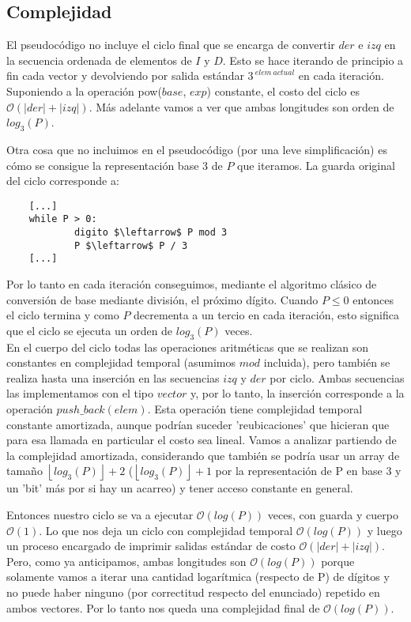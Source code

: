 \newpage
\subsection{Complejidad}
	El pseudocódigo no incluye el ciclo final que se encarga de convertir $der$ e $izq$ en la secuencia ordenada de elementos de $I$ y $D$. Esto se hace iterando de principio a fin cada vector y devolviendo por salida estándar $3^{\ elem \ actual}$ en cada iteración. Suponiendo a la operación pow($base$, $exp$) constante, el costo del ciclo es $\mathcal{O} (|der| + |izq|)$. Más adelante vamos a ver que ambas longitudes son orden de $log_3(P)$.

	Otra cosa que no incluimos en el pseudocódigo (por una leve simplificación) es cómo se consigue la representación base 3 de $P$ que iteramos. La guarda original del ciclo corresponde a:

	\begin{lstlisting}
	[...]
	while P > 0:
        	digito $\leftarrow$ P mod 3
        	P $\leftarrow$ P / 3
	[...]
	\end{lstlisting}

	Por lo tanto en cada iteración conseguimos, mediante el algoritmo clásico de conversión de base mediante división, el próximo dígito. Cuando $P \leq 0$ entonces el ciclo termina y como $P$ decrementa a un tercio en cada iteración, esto significa que el ciclo se ejecuta un orden de $log_3(P)$ veces.
	\\

	En el cuerpo del ciclo todas las operaciones aritméticas que se realizan son constantes en complejidad temporal (asumimos $mod$ incluida), pero también se realiza hasta una inserción en las secuencias $izq$ y $der$ por ciclo. Ambas secuencias las implementamos con el tipo $vector$ y, por lo tanto, la inserción corresponde a la operación $push\_back(elem)$. Esta operación tiene complejidad temporal constante amortizada, aunque podrían suceder 'reubicaciones' que hicieran que para esa llamada en particular el costo sea lineal. Vamos a analizar partiendo de la complejidad amortizada, considerando que también se podría usar un array de tamaño $\left \lfloor{log_3(P)}\right \rfloor + 2$ ($\left \lfloor{log_3(P)}\right \rfloor + 1$ por la representación de P en base 3 y un 'bit' más por si hay un acarreo) y tener acceso constante en general.

	Entonces nuestro ciclo se va a ejecutar $\mathcal{O} (log(P))$ veces, con guarda y cuerpo $\mathcal{O} (1)$. Lo que nos deja un ciclo con complejidad temporal $\mathcal{O} (log(P))$ y luego un proceso encargado de imprimir salidas estándar de costo $\mathcal{O} (|der| + |izq|)$. Pero, como ya anticipamos, ambas longitudes son $\mathcal{O} (log(P))$ porque solamente vamos a iterar una cantidad logarítmica (respecto de P) de dígitos y no puede haber ninguno (por correctitud respecto del enunciado) repetido en ambos vectores. Por lo tanto nos queda una complejidad final de $\mathcal{O} (log(P))$.
	\\

